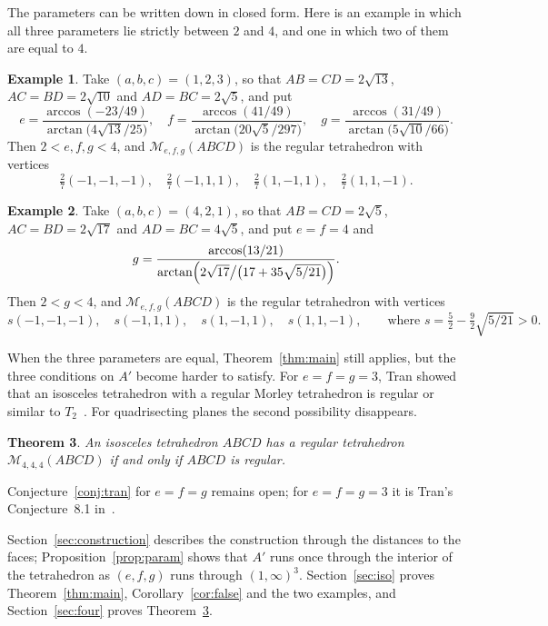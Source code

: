 \documentclass[11pt]{amsart}
\newtheorem{theorem}{Theorem}[section]
\theoremstyle{definition}
\newtheorem{example}[theorem]{Example}
\theoremstyle{remark}
\numberwithin{equation}{section}
\newcommand{\M}{\mathcal{M}}
\begin{document}
The parameters can be written down in closed form. Here is an example in which all three parameters lie strictly between $2$ and $4$, and one in which two of them are equal to $4$.

\begin{example}\label{ex:123}
Take $(a,b,c)=(1,2,3)$, so that $AB=CD=2\sqrt{13}$, $AC=BD=2\sqrt{10}$ and $AD=BC=2\sqrt5$, and put
\[
e=\frac{\arccos(-23/49)}{\arctan\bigl(4\sqrt{13}/25\bigr)},\quad
f=\frac{\arccos(41/49)}{\arctan\bigl(20\sqrt5/297\bigr)},\quad
g=\frac{\arccos(31/49)}{\arctan\bigl(5\sqrt{10}/66\bigr)}.
\]
Then $2<e,f,g<4$, and $\M_{e,f,g}(ABCD)$ is the regular tetrahedron with vertices
\[
\tfrac27(-1,-1,-1),\quad \tfrac27(-1,1,1),\quad \tfrac27(1,-1,1),\quad \tfrac27(1,1,-1).
\]
\end{example}

\begin{example}\label{ex:44}
Take $(a,b,c)=(4,2,1)$, so that $AB=CD=2\sqrt5$, $AC=BD=2\sqrt{17}$ and $AD=BC=4\sqrt5$, and put $e=f=4$ and
\[
g=\frac{\arccos(13/21)}{\arctan\Bigl(2\sqrt{17}\big/\bigl(17+35\sqrt{5/21}\bigr)\Bigr)} .
\]
Then $2<g<4$, and $\M_{e,f,g}(ABCD)$ is the regular tetrahedron with vertices
\[
s(-1,-1,-1),\quad s(-1,1,1),\quad s(1,-1,1),\quad s(1,1,-1),\qquad\text{where } s=\tfrac52-\tfrac92\sqrt{5/21}>0.
\]
\end{example}

When the three parameters are equal, Theorem~\ref{thm:main} still applies, but the three conditions on $A'$ become harder to satisfy. For $e=f=g=3$, Tran showed that an isosceles tetrahedron with a regular Morley tetrahedron is regular or similar to $T_2$~\cite[Theorem~10.3]{Tr26a}. For quadrisecting planes the second possibility disappears.

\begin{theorem}\label{thm:four}
An isosceles tetrahedron $ABCD$ has a regular tetrahedron $\M_{4,4,4}(ABCD)$ if and only if $ABCD$ is regular.
\end{theorem}

Conjecture~\ref{conj:tran} for $e=f=g$ remains open; for $e=f=g=3$ it is Tran's Conjecture~8.1 in~\cite{Tr26a}.

Section~\ref{sec:construction} describes the construction through the distances to the faces; Proposition~\ref{prop:param} shows that $A'$ runs once through the interior of the tetrahedron as $(e,f,g)$ runs through $(1,\infty)^3$. Section~\ref{sec:iso} proves Theorem~\ref{thm:main}, Corollary~\ref{cor:false} and the two examples, and Section~\ref{sec:four} proves Theorem~\ref{thm:four}.
\end{document}
